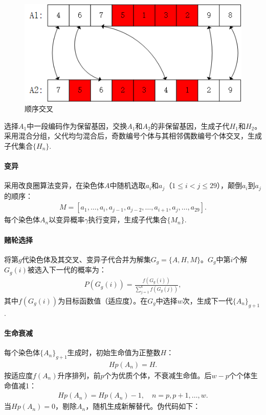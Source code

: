 \documentclass{whutmod}
\begin{document}
                    \begin{figure}[H]
                        \centering
                        \includegraphics[width=.75\textwidth]{figures/cross.png}
                        \caption{顺序交叉}\label{gbf}
                    \end{figure}

                    选择$A_1$中一段编码作为保留基因，交换$A_1$和$A_2$的非保留基因，生成子代$H_1$和$H_2$。采用混合分组，父代均匀混合后，奇数编号个体与其相邻偶数编号个体交叉，生成子代集合$\{H_n\}$.

                \paragraph{变异}
                    采用改良圈算法变异，在染色体$A$中随机选取$a_i$和$a_j$（$1 \leqslant i < j \leqslant 29$），颠倒$a_i$到$a_j$的顺序：
                    \begin{gather}
                        M = [a_1, \dots, a_i, a_{j-1}, a_{j-2}, \dots, a_{i+1}, a_j, \dots, a_{29}].
                    \end{gather}
                    每个染色体$A_n$以变异概率$\gamma$执行变异，生成子代集合$\{M_n\}$.

                \paragraph{赌轮选择}
                    将第$g$代染色体及其交叉、变异子代合并为解集$G_g = \{A, H, M\}$。$G_g$中第$i$个解$G_g(i)$被选入下一代的概率为：
                    \begin{gather}
                        P(G_g(i)) = \frac{f(G_g(i))}{\sum_{j=1}^{k} f(G_g(j))},
                    \end{gather}
                    其中$f(G_g(i))$为目标函数值（适应度）。在$G_g$中选择$w$次，生成下一代$\{A_n\}_{g+1}$.

                \paragraph{生命衰减}
                    每个染色体$\{A_n\}_{g+1}$生成时，初始生命值为正整数$H$：
                    \begin{gather}
                        Hp(A_n) = H.
                    \end{gather}
                    按适应度$f(A_n)$升序排列，前$p$个为优质个体，不衰减生命值。后$w-p$个个体生命值减1：
                    \begin{gather}
                        Hp(A_n) = Hp(A_n) - 1, \quad n = p, p+1, \dots, w.
                    \end{gather}
                    当$Hp(A_n) = 0$，剔除$A_n$，随机生成新解替代。伪代码如下：
\end{document}
